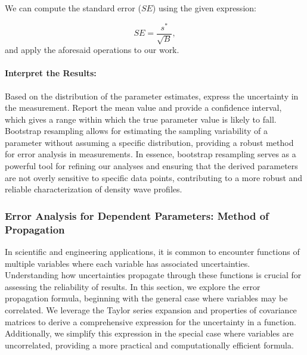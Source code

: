 \documentclass{article}
\begin{document}
We can compute the standard error ($SE$) using the given expression\cite{Chernick2007BootstrapMA}\cite{davison_hinkley_1997}\cite{Efron1994AnIT}:

\begin{equation}
SE = \frac{s^{*}}{\sqrt{B}},
\end{equation}
and apply the aforesaid operations to our work.



\paragraph{Interpret the Results:}
Based on the distribution of the parameter estimates, express the uncertainty in the measurement. Report the mean value and provide a confidence interval, which gives a range within which the true parameter value is likely to fall. Bootstrap resampling allows for estimating the sampling variability of a parameter without assuming a specific distribution, providing a robust method for error analysis in measurements. In essence, bootstrap resampling serves as a powerful tool for refining our analyses and ensuring that the derived parameters are not overly sensitive to specific data points, contributing to a more robust and reliable characterization of density wave profiles.

\subsubsection{Error Analysis for Dependent Parameters: Method of Propagation}
In scientific and engineering applications, it is common to encounter functions of multiple variables where each variable has associated uncertainties. Understanding how uncertainties propagate through these functions is crucial for assessing the reliability of results. In this section, we explore the error propagation formula, beginning with the general case where variables may be correlated. We leverage the Taylor series expansion and properties of covariance matrices to derive a comprehensive expression for the uncertainty in a function. Additionally, we simplify this expression in the special case where variables are uncorrelated, providing a more practical and computationally efficient formula.
\end{document}
